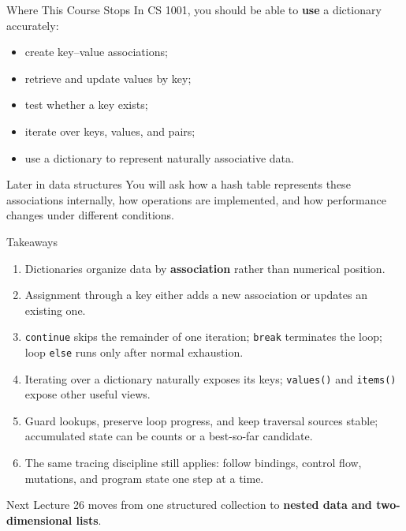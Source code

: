 \documentclass[aspectratio=169,10pt]{beamer}
\begin{document}
\begin{frame}{Where This Course Stops}
  In CS 1001, you should be able to \textbf{use} a dictionary accurately:

  \begin{itemize}
    \item create key--value associations;
    \item retrieve and update values by key;
    \item test whether a key exists;
    \item iterate over keys, values, and pairs;
    \item use a dictionary to represent naturally associative data.
  \end{itemize}

  \begin{block}{Later in data structures}
    You will ask how a hash table represents these associations internally, how operations are implemented, and how performance changes under different conditions.
  \end{block}
\end{frame}

\begin{frame}{Takeaways}
  \begin{enumerate}
    \item Dictionaries organize data by \textbf{association} rather than numerical position.
    \item Assignment through a key either adds a new association or updates an existing one.
    \item \texttt{continue} skips the remainder of one iteration; \texttt{break} terminates the loop; loop \texttt{else} runs only after normal exhaustion.
    \item Iterating over a dictionary naturally exposes its keys; \texttt{values()} and \texttt{items()} expose other useful views.
    \item Guard lookups, preserve loop progress, and keep traversal sources stable; accumulated state can be counts or a best-so-far candidate.
    \item The same tracing discipline still applies: follow bindings, control flow, mutations, and program state one step at a time.
  \end{enumerate}

  \begin{block}{Next}
    Lecture 26 moves from one structured collection to \textbf{nested data and two-dimensional lists}.
  \end{block}
\end{frame}
\end{document}
